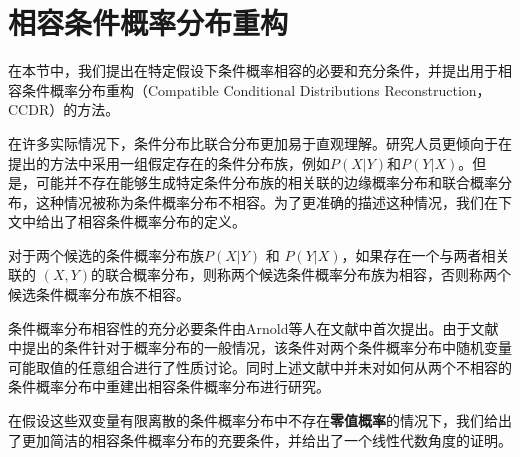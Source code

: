\section{相容条件概率分布重构}
在本节中，我们提出在特定假设下条件概率相容的必要和充分条件，并提出用于相容条件概率分布重构（Compatible Conditional Distributions Reconstruction，CCDR）的方法。

在许多实际情况下，条件分布比联合分布更加易于直观理解。研究人员更倾向于在提出的方法中采用一组假定存在的条件分布族，例如$P(X|Y)$和$P(Y|X)$\cite{arnold1989compatible}。但是，可能并不存在能够生成特定条件分布族的相关联的边缘概率分布和联合概率分布，这种情况被称为条件概率分布不相容。为了更准确的描述这种情况，我们在下文中给出了相容条件概率分布的定义。

\begin{definition}
    对于两个候选的条件概率分布族$ P(X|Y) $ 和 $ P(Y|X) $，如果存在一个与两者相关联的 $ (X,Y) $的联合概率分布，则称两个候选条件概率分布族为相容，否则称两个候选条件概率分布族不相容。
\end{definition}

条件概率分布相容性的充分必要条件由Arnold等人在文献\parencite{arnold1989compatible}中首次提出。由于文献\parencite{arnold1989compatible}中提出的条件针对于概率分布的一般情况，该条件对两个条件概率分布中随机变量可能取值的任意组合进行了性质讨论。同时上述文献中并未对如何从两个不相容的条件概率分布中重建出相容条件概率分布进行研究。

在假设这些双变量有限离散的条件概率分布中不存在\textbf{零值概率}的情况下，我们给出了更加简洁的相容条件概率分布的充要条件，并给出了一个线性代数角度的证明。

